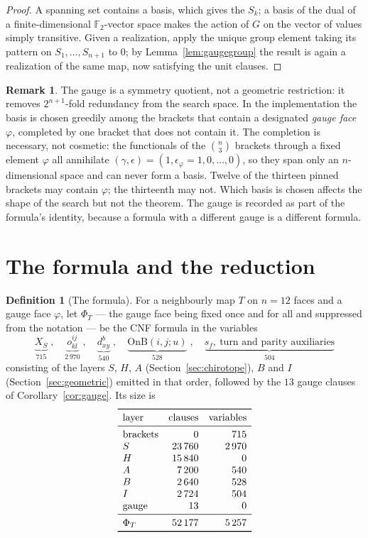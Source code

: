 \documentclass[11pt,reqno]{amsart}
\theoremstyle{plain}
\theoremstyle{definition}
\newtheorem{definition}[theorem]{Definition}
\newtheorem{remark}[theorem]{Remark}
\newcommand{\FF}{\mathbb{F}_2}
\newcommand{\OnB}{\mathrm{OnB}}
\begin{document}
\begin{proof}
A spanning set contains a basis, which gives the $S_k$; a basis of the dual of a finite-dimensional
$\FF$-vector space makes the action of $G$ on the vector of values simply transitive. Given a
realization, apply the unique group element taking its pattern on $S_1,\dots,S_{n+1}$ to $0$; by
Lemma~\ref{lem:gaugegroup} the result is again a realization of the same map, now satisfying the unit
clauses.
\end{proof}

\begin{remark}
The gauge is a symmetry quotient, not a geometric restriction: it removes $2^{n+1}$-fold redundancy
from the search space. In the implementation the basis is chosen greedily among the brackets that
contain a designated \emph{gauge face} $\varphi$, completed by one bracket that does not contain it.
The completion is necessary, not cosmetic: the functionals of the $\binom{n}{3}$ brackets through a
fixed element $\varphi$ all annihilate $(\gamma,\epsilon)=(1,\epsilon_\varphi{=}1,0,\dots,0)$, so they
span only an $n$-dimensional space and can never form a basis. Twelve of the thirteen pinned brackets
may contain $\varphi$; the thirteenth may not. Which basis is chosen affects the shape of the search
but not the theorem. The gauge is recorded as part of the
formula's identity, because a formula with a different gauge is a different formula.
\end{remark}

\section{The formula and the reduction}\label{sec:formula}

\begin{definition}[The formula]\label{def:formula}
For a neighbourly map $T$ on $n=12$ faces and a gauge face $\varphi$, let $\Phi_T$ --- the gauge face
being fixed once and for all and suppressed from the notation --- be the CNF formula
in the variables
\[
  \underbrace{X_S}_{715}\;,\quad
  \underbrace{o^{ij}_{kl}}_{2\,970}\;,\quad
  \underbrace{d^{b}_{xy}}_{540}\;,\quad
  \underbrace{\OnB(i,j;u)}_{528}\;,\quad
  \underbrace{s_f,\ \text{turn and parity auxiliaries}}_{504}
\]
consisting of the layers $S$, $H$, $A$ (Section~\ref{sec:chirotope}), $B$ and $I$
(Section~\ref{sec:geometric}) emitted in that order, followed by the $13$ gauge clauses of
Corollary~\ref{cor:gauge}. Its size is
\[
\begin{array}{lrr}
\toprule
\text{layer} & \text{clauses} & \text{variables}\\
\midrule
\text{brackets} & 0 & 715\\
S & 23\,760 & 2\,970\\
H & 15\,840 & 0\\
A & 7\,200 & 540\\
B & 2\,640 & 528\\
I & 2\,724 & 504\\
\text{gauge} & 13 & 0\\
\midrule
\Phi_T & 52\,177 & 5\,257\\
\bottomrule
\end{array}
\]
\end{definition}
\end{document}
